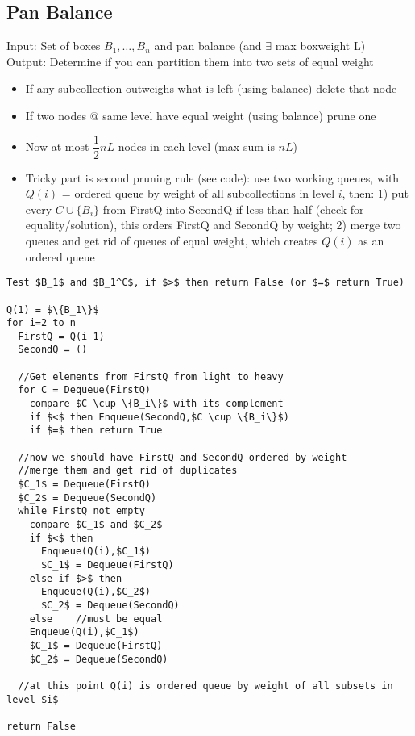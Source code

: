 \documentclass[12pt]{article}
\providecommand{\tightlist}{
    \setlength{\itemsep}{0pt}\setlength{\parskip}{0pt}
}
\begin{document}
\subsection{Pan Balance}
Input: Set of boxes $B_1, \dots, B_n$ and pan balance (and $\exists$ max boxweight L)\\
Output: Determine if you can partition them into two sets of equal weight\\
\begin{itemize}\tightlist
  \item If any subcollection outweighs what is left (using balance) delete that node
  \item If two nodes @ same level have equal weight (using balance) prune one
  \item Now at most $\dfrac{1}{2}nL$ nodes in each level (max sum is $nL$)
  \item Tricky part is second pruning rule (see code): use two working queues, with $Q(i)$ = ordered queue by weight of all subcollections in level $i$, then: 1) put every $C \cup \{B_i\}$ from FirstQ into SecondQ if less than half (check for equality/solution), this orders FirstQ and SecondQ by weight; 2) merge two queues and get rid of queues of equal weight, which creates $Q(i)$ as an ordered queue
\end{itemize}
\begin{lstlisting}
Test $B_1$ and $B_1^C$, if $>$ then return False (or $=$ return True)

Q(1) = $\{B_1\}$
for i=2 to n
  FirstQ = Q(i-1)
  SecondQ = ()

  //Get elements from FirstQ from light to heavy
  for C = Dequeue(FirstQ)
    compare $C \cup \{B_i\}$ with its complement
    if $<$ then Enqueue(SecondQ,$C \cup \{B_i\}$)
    if $=$ then return True

  //now we should have FirstQ and SecondQ ordered by weight
  //merge them and get rid of duplicates
  $C_1$ = Dequeue(FirstQ)
  $C_2$ = Dequeue(SecondQ)
  while FirstQ not empty
    compare $C_1$ and $C_2$
    if $<$ then
      Enqueue(Q(i),$C_1$)
      $C_1$ = Dequeue(FirstQ)
    else if $>$ then
      Enqueue(Q(i),$C_2$)
      $C_2$ = Dequeue(SecondQ)
    else    //must be equal
    Enqueue(Q(i),$C_1$)
    $C_1$ = Dequeue(FirstQ)
    $C_2$ = Dequeue(SecondQ)

  //at this point Q(i) is ordered queue by weight of all subsets in level $i$

return False
\end{lstlisting}
\end{document}
